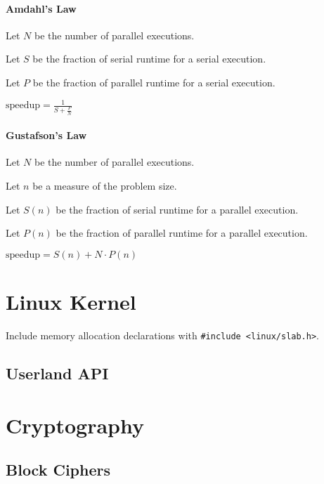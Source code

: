 \documentclass[12pt]{book}
\begin{document}
  \subsubsection{Amdahl's Law}

  Let $N$ be the number of parallel executions.

  \noindent Let $S$ be the fraction of serial runtime for a serial execution.

  \noindent Let $P$ be the fraction of parallel runtime for a serial execution.

  \vspace{1em}

  $\text{speedup} = \frac{1}{S + \frac{P}{N}}$

  \subsubsection{Gustafson's Law}

  Let $N$ be the number of parallel executions.

  \noindent Let $n$ be a measure of the problem size.

  \noindent Let $S(n)$ be the fraction of serial runtime for a parallel
  execution.

  \noindent Let $P(n)$ be the fraction of parallel runtime for a parallel
  execution.

  \vspace{1em}

  $\text{speedup} = S(n) + N \cdot P(n)$

  \chapter{Linux Kernel}

  Include memory allocation declarations with
  \texttt{#include <linux/slab.h>}.

  \section{Userland API}

  \chapter{Cryptography}

  \section{Block Ciphers}
\end{document}
